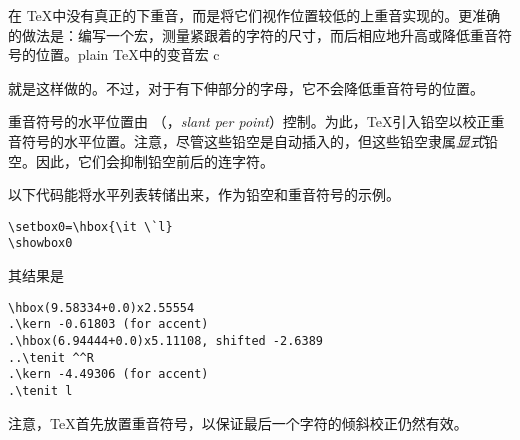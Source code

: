 \documentclass{book}
\begin{document}
在 \TeX 中没有真正的下重音，而是将它们视作位置较低的上重音实现的。更准确的做法是：编写一个宏，测量紧跟着的字符的尺寸，而后相应地升高或降低重音符号的位置。plain \TeX 中的变音宏 \cstoidx c\par 就是这样做的。不过，对于有下伸部分的字母，它不会降低重音符号的位置。

重音符号的水平位置由 （，\emph{slant per point}）控制。为此，\TeX 引入铅空以校正重音符号的水平位置。注意，尽管这些铅空是自动插入的，但这些铅空隶属\emph{显式}铅空。因此，它们会抑制铅空前后的连字符。

以下代码能将水平列表转储出来，作为铅空和重音符号的示例。
\begin{verbatim}
\setbox0=\hbox{\it \`l}
\showbox0
\end{verbatim}
其结果是
\begin{verbatim}
\hbox(9.58334+0.0)x2.55554
.\kern -0.61803 (for accent)
.\hbox(6.94444+0.0)x5.11108, shifted -2.6389
..\tenit ^^R
.\kern -4.49306 (for accent)
.\tenit l
\end{verbatim}
注意，\TeX 首先放置重音符号，以保证最后一个字符的倾斜校正仍然有效。

\end{document}
